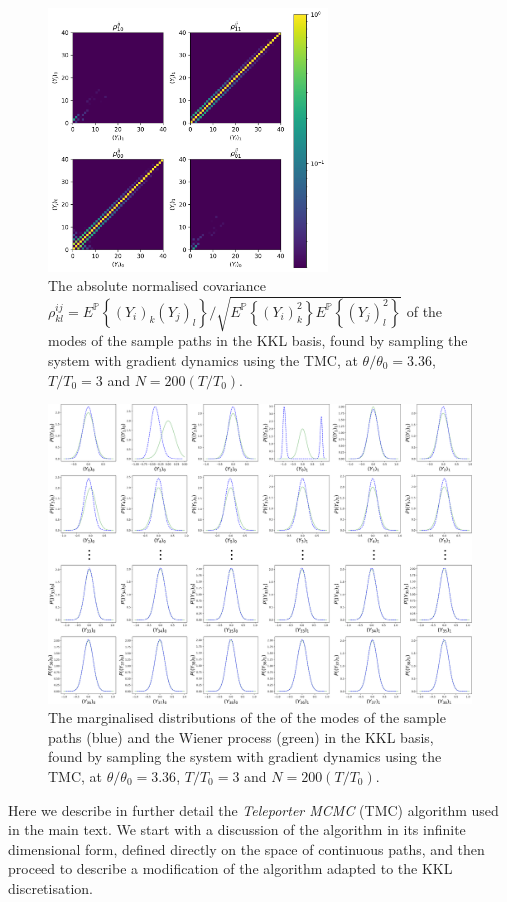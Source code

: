 \begin{figure}[t]
\includegraphics[width=0.66\textwidth]{figs_part1/mcmc/mode_convergence_covariance}
\centering \caption{The absolute normalised covariance $\rho_{kl}^{ij}=E^{\mathbb{P}}\left\{ (Y_{i})_{k}(Y_{j})_{l}\right\} /\sqrt{E^{\mathbb{P}}\left\{ (Y_{i})_{k}^{2}\right\} E^{\mathbb{P}}\left\{ (Y_{j})_{l}^{2}\right\} }$
of the modes of the sample paths in the KKL basis, found by sampling
the system with gradient dynamics using the TMC, at $\theta/\theta_{0}=3.36$,
$T/T_{0}=3$ and $N=200(T/T_{0})$.}
\label{fig:mode covariance} 
\end{figure}

\begin{figure}[t]
\includegraphics[width=1\textwidth]{figs_part1/mcmc/mode_convergence_marginalised}
\centering \caption{The marginalised distributions of the of the modes of the sample paths
(blue) and the Wiener process (green) in the KKL basis, found by sampling
the system with gradient dynamics using the TMC, at $\theta/\theta_{0}=3.36$,
$T/T_{0}=3$ and $N=200(T/T_{0})$.}
\label{fig:mode marginalised} 
\end{figure}
Here we describe in further detail the \emph{Teleporter MCMC }(TMC)
algorithm used in the main text. We start with a discussion of the
algorithm in its infinite dimensional form, defined directly on the
space of continuous paths, and then proceed to describe a modification
of the algorithm adapted to the KKL discretisation.


